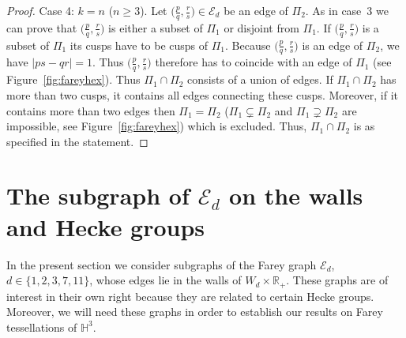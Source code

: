 \documentclass[graybox]{svmult}
\begin{document}
\begin{proof}
Case 4: $k=n$ ($n\ge 3$). Let $\big(\frac pq, \frac rs\big)\in\mathcal{E}_d$ be an edge of $\Pi_2$. As in case~3 we can prove that $\big(\frac pq, \frac rs\big)$  is either a subset of $\Pi_1$ or disjoint from $\Pi_1$. If $\big(\frac pq, \frac rs\big)$ is a subset of $\Pi_1$ its cusps have to be cusps of $\Pi_1$. Because $\big(\frac pq, \frac rs\big)$ is an edge of $\Pi_2$, we have $|ps-qr|=1$. Thus $\big(\frac pq, \frac rs\big)$ therefore has to coincide with an edge of $\Pi_1$ (see Figure~\ref{fig:fareyhex}). Thus $\Pi_1\cap\Pi_2$ consists of a union of edges. If $\Pi_1\cap\Pi_2$ has more than two cusps, it contains all edges connecting these cusps. Moreover, if it contains more than two edges then $\Pi_1= \Pi_2$ ($\Pi_1 \subsetneq \Pi_2$ and $\Pi_1 \supsetneq \Pi_2$ are impossible, see Figure~\ref{fig:fareyhex}) which is excluded. Thus, $\Pi_1\cap\Pi_2$ is as specified in the statement.
\end{proof}


\section{The subgraph of $\mathcal{E}_d$ on the walls and Hecke groups} \label{sec:hecke}

In the present section we consider subgraphs of the Farey graph $\mathcal{E}_d$, $d\in\{1,2,3,7,11\}$, whose edges lie in the walls of $W_d\times\mathbb{R}_+$. These graphs are of interest in their own right because they are related to certain Hecke groups. Moreover, we will need these graphs in order to establish our results on Farey tessellations of $\mathbb{H}^3$.
\end{document}
